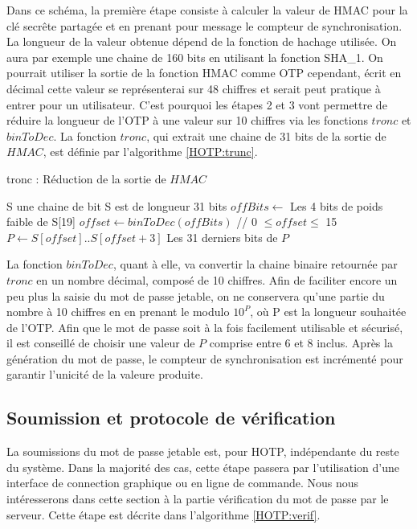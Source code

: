 \documentclass{../res/univ-projet}
\begin{document}
  Dans ce schéma, la première étape consiste à calculer la valeur de HMAC pour la clé secr\^ete partagée et en prenant pour message le compteur de synchronisation. La 
  longueur de la valeur obtenue dépend de la fonction de hachage utilisée. On aura par exemple une chaine de 160 bits en utilisant la fonction SHA\_1.
  On pourrait utiliser la sortie de la fonction HMAC comme OTP cependant, écrit en décimal cette valeur se représenterai sur 48 chiffres et serait peut pratique à entrer 
  pour un utilisateur. C'est pourquoi les étapes 2 et 3 vont permettre de réduire la longueur de l'OTP à une valeur sur 10 chiffres via les fonctions $tronc$ et 
  $binToDec$. La fonction $tronc$, qui extrait une chaine de 31 bits de la sortie de $HMAC$, est définie par l'algorithme \ref{HOTP:trunc}.
  
  \begin{algorithm}
    \caption{tronc : Réduction de la sortie de $HMAC$}
    \label{HOTP:trunc}
    
    \begin{algorithmic}
      \REQUIRE S une chaine de bit
      \ENSURE S est de longueur 31 bits
      \STATE $offBits \leftarrow$ Les 4 bits de poids faible de S[19]
      \STATE $offset \leftarrow binToDec(offBits)$ // 0 $\leq offset \leq$ 15
      \STATE $P \leftarrow S[offset]..S[offset + 3]$ \newline
      \RETURN Les 31 derniers bits de $P$
    \end{algorithmic}
  \end{algorithm}

  La fonction $binToDec$, quant à elle, va convertir la chaine binaire retournée par $tronc$ en un nombre décimal, composé de 10 chiffres. Afin de faciliter encore un peu 
  plus la saisie du mot de passe jetable, on ne conservera qu'une partie du nombre à 10 chiffres en en prenant le modulo $10^P$, o\`u P est la longueur souhaitée de l'OTP.
  Afin que le mot de passe soit à la fois facilement utilisable et sécurisé, il est conseillé de choisir une valeur de $P$ comprise entre 6 et 8 inclus.
  Après la génération du mot de passe, le compteur de synchronisation est incrémenté pour garantir l'unicité de la valeure produite.
  
  \subsection{Soumission et protocole de vérification}
  La soumissions du mot de passe jetable est, pour HOTP, indépendante du reste du système. Dans la majorité des cas, cette étape passera par l'utilisation d'une interface 
  de connection graphique ou en ligne de commande. Nous nous intéresserons dans cette section à la partie vérification du mot de passe par le serveur. Cette étape est 
  décrite dans l'algorithme \ref{HOTP:verif}.
  
\end{document}
